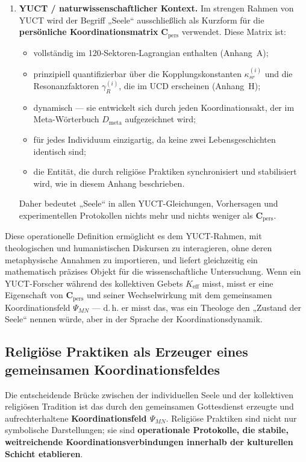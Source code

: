 \documentclass[12pt,a4paper]{article}
\begin{document}
\begin{enumerate}[leftmargin=*]
		\item \textbf{YUCT / naturwissenschaftlicher Kontext.}
		Im strengen Rahmen von YUCT wird der Begriff „Seele“ ausschließlich als Kurzform für die \textbf{persönliche Koordinationsmatrix} \(\mathbf{C}_{\text{pers}}\) verwendet. Diese Matrix ist:
		\begin{itemize}
			\item vollständig im 120‑Sektoren‑Lagrangian enthalten (Anhang~A);
			\item prinzipiell quantifizierbar über die Kopplungskonstanten \(\kappa_{sr}^{(i)}\) und die Resonanzfaktoren \(\gamma_R^{(i)}\), die im UCD erscheinen (Anhang~H);
			\item dynamisch — sie entwickelt sich durch jeden Koordinationsakt, der im Meta-Wörterbuch \(D_{\text{meta}}\) aufgezeichnet wird;
			\item für jedes Individuum einzigartig, da keine zwei Lebensgeschichten identisch sind;
			\item die Entität, die durch religiöse Praktiken synchronisiert und stabilisiert wird, wie in diesem Anhang beschrieben.
		\end{itemize}
		Daher bedeutet „Seele“ in allen YUCT-Gleichungen, Vorhersagen und experimentellen Protokollen nichts mehr und nichts weniger als \(\mathbf{C}_{\text{pers}}\).
	\end{enumerate}
	
	Diese operationelle Definition ermöglicht es dem YUCT-Rahmen, mit theologischen und humanistischen Diskursen zu interagieren, ohne deren metaphysische Annahmen zu importieren, und liefert gleichzeitig ein mathematisch präzises Objekt für die wissenschaftliche Untersuchung. Wenn ein YUCT-Forscher während des kollektiven Gebets \(K_{\mathrm{eff}}\) misst, misst er eine Eigenschaft von \(\mathbf{C}_{\text{pers}}\) und seiner Wechselwirkung mit dem gemeinsamen Koordinationsfeld \(\Psi_{MN}\) — d. h. er misst das, was ein Theologe den „Zustand der Seele“ nennen würde, aber in der Sprache der Koordinationsdynamik.
	
	\subsection{Religiöse Praktiken als Erzeuger eines gemeinsamen Koordinationsfeldes}
	
	Die entscheidende Brücke zwischen der individuellen Seele und der kollektiven religiösen Tradition ist das durch den gemeinsamen Gottesdienst erzeugte und aufrechterhaltene \textbf{Koordinationsfeld \(\Psi_{MN}\)}. Religiöse Praktiken sind nicht nur symbolische Darstellungen; sie sind \textbf{operationale Protokolle, die stabile, weitreichende Koordinationsverbindungen innerhalb der kulturellen Schicht etablieren}.
	
\end{document}
